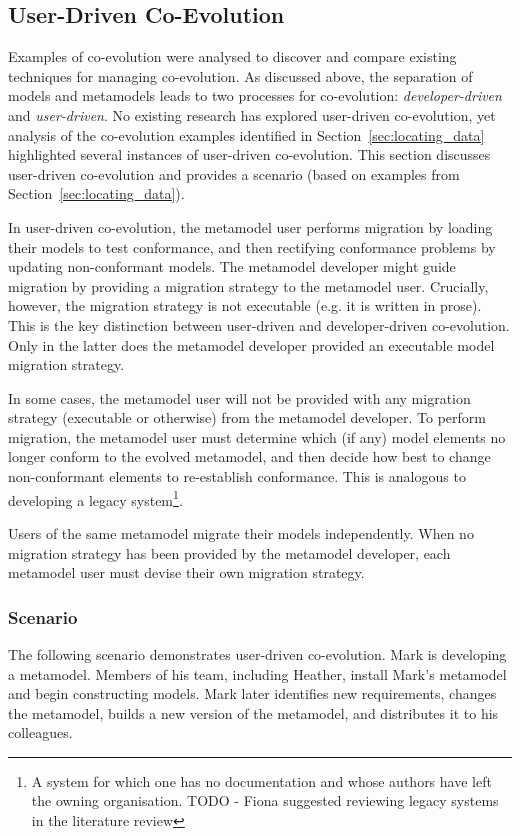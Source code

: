 \subsection{User-Driven Co-Evolution}
\label{subsec:user-driven_co-evolution}
Examples of co-evolution were analysed to discover and compare existing techniques for managing co-evolution. As discussed above, the separation of models and metamodels leads to two processes for co-evolution: \emph{developer-driven} and \emph{user-driven}. No existing research has explored user-driven co-evolution, yet analysis of the co-evolution examples identified in Section~\ref{sec:locating_data} highlighted several instances of user-driven co-evolution. This section discusses user-driven co-evolution and provides a scenario (based on examples from Section~\ref{sec:locating_data}).

In user-driven co-evolution, the metamodel user performs migration by loading their models to test conformance, and then rectifying conformance problems by updating non-conformant models. The metamodel developer might guide migration by providing a migration strategy to the metamodel user. Crucially, however, the migration strategy is not executable (e.g. it is written in prose). This is the key distinction between user-driven and developer-driven co-evolution. Only in the latter does the metamodel developer provided an executable model migration strategy.  

In some cases, the metamodel user will not be provided with any migration strategy (executable or otherwise) from the metamodel developer. To perform migration, the metamodel user must determine which (if any) model elements no longer conform to the evolved metamodel, and then decide how best to change non-conformant elements to re-establish conformance. This is analogous to developing a legacy system\footnote{A system for which one has no documentation and whose authors have left the owning organisation. TODO - Fiona suggested reviewing legacy systems in the literature review}.

Users of the same metamodel migrate their models independently. When no migration strategy has been provided by the metamodel developer, each metamodel user must devise their own migration strategy.

\subsubsection{Scenario}
The following scenario demonstrates user-driven co-evolution. Mark is developing a metamodel. Members of his team, including Heather, install Mark's metamodel and begin constructing models. Mark later identifies new requirements, changes the metamodel, builds a new version of the metamodel, and distributes it to his colleagues.

